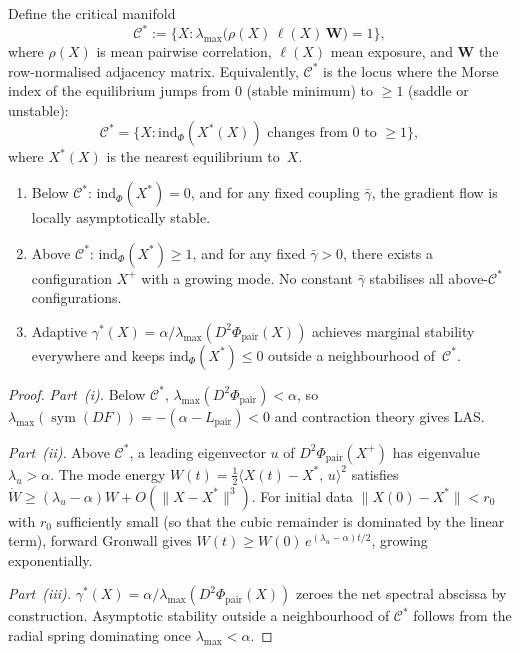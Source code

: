 \documentclass[final]{siamltex}
\newcommand{\norm}[1]{\lVert #1 \rVert}
\newcommand{\inner}[2]{\langle #1,\, #2 \rangle}
\newcommand{\Cman}{\mathcal{C}^*}
\newcommand{\Xst}{X^*}
\newcommand{\Lpair}{L_{\mathrm{pair}}}
\newcommand{\lmax}{\lambda_{\max}}
\DeclareMathOperator{\sym}{sym}
\begin{document}
\begin{theorem}\label{thm:phase}
Define the critical manifold
\begin{equation}\label{eq:cman}
  \Cman := \bigl\{X : \lmax\bigl(\rho(X)\,\ell(X)\,
  \mathbf{W}\bigr) = 1\bigr\},
\end{equation}
where $\rho(X)$ is mean pairwise correlation, $\ell(X)$ mean
exposure, and $\mathbf{W}$ the row-normalised adjacency matrix.
Equivalently, $\Cman$ is the locus where the Morse index of the
equilibrium jumps from $0$ (stable minimum) to $\ge 1$ (saddle
or unstable):
\begin{equation}\label{eq:cman_morse}
  \Cman = \bigl\{X : \mathrm{ind}_\Phi(X^*(X)) \text{ changes
  from } 0 \text{ to } \ge 1\bigr\},
\end{equation}
where $X^*(X)$ is the nearest equilibrium to~$X$.
\begin{enumerate}
\item[\textup{(i)}] Below $\Cman$: $\mathrm{ind}_\Phi(\Xst)=0$,
  and for any fixed coupling $\bar{\gamma}$, the gradient flow is
  locally asymptotically stable.
\item[\textup{(ii)}] Above $\Cman$: $\mathrm{ind}_\Phi(\Xst)\ge 1$,
  and for any fixed $\bar{\gamma}>0$, there exists a configuration
  $X^+$ with a growing mode. No constant $\bar{\gamma}$ stabilises
  all above-$\Cman$ configurations.
\item[\textup{(iii)}] Adaptive $\gamma^*(X)=\alpha/
  \lmax(D^2\Phi_{\mathrm{pair}}(X))$ achieves marginal stability
  everywhere and keeps $\mathrm{ind}_\Phi(\Xst)\le 0$ outside a
  neighbourhood of~$\Cman$.
\end{enumerate}
\end{theorem}

\begin{proof}
\textit{Part~(i).} Below $\Cman$,
$\lmax(D^2\Phi_{\mathrm{pair}})<\alpha$, so
$\lmax(\sym(DF))=-(\alpha-\Lpair)<0$ and contraction theory
\cite{lohmiller1998contraction} gives LAS.

\textit{Part~(ii).} Above $\Cman$, a leading eigenvector $u$ of
$D^2\Phi_{\mathrm{pair}}(X^+)$ has eigenvalue
$\lambda_u>\alpha$. The mode energy
$W(t)=\frac{1}{2}\inner{X(t){-}\Xst}{u}^2$ satisfies
$\dot{W}\ge(\lambda_u{-}\alpha)W + O(\norm{X{-}\Xst}^3)$.
For initial data $\norm{X(0){-}\Xst} < r_0$ with $r_0$
sufficiently small (so that the cubic remainder is dominated
by the linear term), forward Gronwall gives
$W(t) \ge W(0)\,e^{(\lambda_u{-}\alpha)t/2}$,
growing exponentially.

\textit{Part~(iii).}
$\gamma^*(X)=\alpha/\lmax(D^2\Phi_{\mathrm{pair}}(X))$ zeroes the
net spectral abscissa by construction. Asymptotic stability outside
a neighbourhood of $\Cman$ follows from the radial spring
dominating once $\lmax<\alpha$.
\end{proof}
\end{document}
